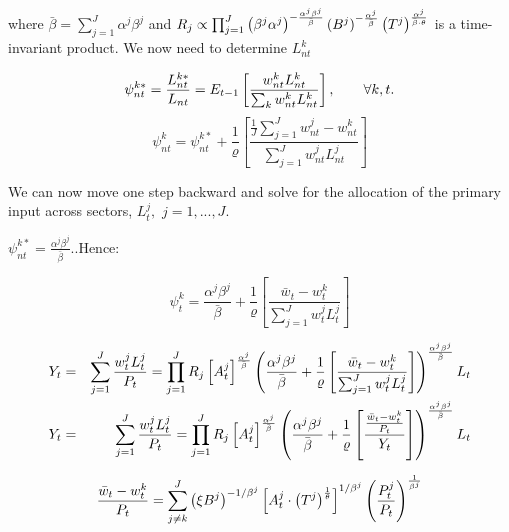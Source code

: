 \documentclass{article}
\begin{document}
\bigskip where $\bar{\beta}=\sum_{j=1}^{J}\alpha ^{j}\beta ^{j}$ and $%
R_{j}\propto \prod_{j=1}^{J}\left( \beta ^{j}\alpha ^{j}\right) ^{-\frac{%
\alpha ^{j}\beta ^{j}}{\bar{\beta}}}(B^{j})^{-\frac{\alpha ^{j}}{\bar{\beta}}%
}\left( T^{j}\right) ^{\frac{\alpha ^{j}}{\bar{\beta}\cdot \theta }}$ is a
time-invariant product. We now need to determine $L_{nt}^{k}$

\begin{equation}
\psi _{nt}^{k\ast }=\frac{L_{nt}^{k\ast }}{L_{nt}}=E_{t-1}\left[ \frac{%
w_{nt}^{k}L_{nt}^{k}}{\sum_{k}w_{nt}^{k}L_{nt}^{k}}\right] ,\qquad \forall
k,t.
\end{equation}%
\begin{equation*}
\psi _{nt}^{k}=\psi _{nt}^{k\ast }+\frac{1}{\varrho }\left[ \frac{\frac{1}{J}%
\sum_{j=1}^{J}w_{nt}^{j}-w_{nt}^{k}}{\sum_{j=1}^{J}w_{nt}^{j}L_{nt}^{j}}%
\right] 
\end{equation*}

We can now move one step backward and solve for the allocation of the
primary input across sectors, $L_{t}^{j},$ $j=1,...,J$. 

$\psi _{nt}^{k\ast }=\frac{\alpha ^{j}\beta ^{j}}{\bar{\beta}}$.$.$Hence:

\begin{equation*}
\psi _{t}^{k}=\frac{\alpha ^{j}\beta ^{j}}{\bar{\beta}}+\frac{1}{\varrho }%
\left[ \frac{\bar{w}_{t}-w_{t}^{k}}{\sum_{j=1}^{J}w_{t}^{j}L_{t}^{j}}\right] 
\end{equation*}

\begin{eqnarray}
Y_{t} &=&\sum_{j=1}^{J}\frac{w_{t}^{j}L_{t}^{j}}{P_{t}}=\prod_{j=1}^{J}R_{j}%
\left[ A_{t}^{j}\right] ^{\frac{\alpha ^{j}}{\bar{\beta}}}\left( \frac{%
\alpha ^{j}\beta ^{j}}{\bar{\beta}}+\frac{1}{\varrho }\left[ \frac{\bar{w}%
_{t}-w_{t}^{k}}{\sum_{j=1}^{J}w_{t}^{j}L_{t}^{j}}\right] \right) ^{\frac{%
\alpha ^{j}\beta ^{j}}{\bar{\beta}}}L_{t}  \label{expost} \\
Y_{t} &=&\sum_{j=1}^{J}\frac{w_{t}^{j}L_{t}^{j}}{P_{t}}=\prod_{j=1}^{J}R_{j}%
\left[ A_{t}^{j}\right] ^{\frac{\alpha ^{j}}{\bar{\beta}}}\left( \frac{%
\alpha ^{j}\beta ^{j}}{\bar{\beta}}+\frac{1}{\varrho }\left[ \frac{\frac{%
\bar{w}_{t}-w_{t}^{k}}{P_{t}}}{Y_{t}}\right] \right) ^{\frac{\alpha
^{j}\beta ^{j}}{\bar{\beta}}}L_{t}
\end{eqnarray}

\begin{equation*}
\frac{\bar{w}_{t}-w_{t}^{k}}{P_{t}}=\sum_{j\neq k}^{J}\left( \xi
B^{j}\right) ^{-1/\beta ^{j}}\left[ A_{t}^{j}\cdot \left( T^{j}\right) ^{%
\frac{1}{\theta }}\right] ^{1/\beta ^{j}}\left( \frac{P_{t}^{j}}{P_{t}}%
\right) ^{\frac{1}{\beta ^{j}}}
\end{equation*}
\end{document}
